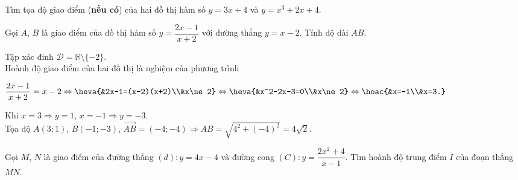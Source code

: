 \begin{bt}%

	Tìm tọa độ giao điểm (\textbf{nếu có}) của hai đồ thị hàm số $y=3x+4$ và $y=x^3+2x+4$.
\end{bt}

\begin{bt}%

	Gọi $A$, $B$ là giao điểm của đồ thị hàm số $y=\dfrac{2x-1}{x+2}$ với đường thẳng $y=x-2$. Tính độ dài $AB$.
	\loigiai
	{Tập xác đinh $\mathscr{D}=\mathbb{R}\setminus \{-2\}$.\\
		Hoành độ giao điểm của hai đồ thị là nghiệm của phương trình
		\begin{center}
			$\dfrac{2x-1}{x+2}=x-2\Leftrightarrow \heva{&2x-1=(x-2)(x+2)\\&x\ne 2}\Leftrightarrow \heva{&x^2-2x-3=0\\&x\ne 2}\Leftrightarrow \hoac{&x=-1\\&x=3.}$
		\end{center}
		Khi $x=3\Rightarrow y=1$, $x=-1\Rightarrow y=-3$.\\
		Tọa độ $A(3;1)$, $B(-1;-3)$, $\overrightarrow{AB}=(-4;-4)\Rightarrow AB=\sqrt{4^2+(-4)^2}=4\sqrt{2}$.
	}
\end{bt}

\begin{bt}%

	Gọi $M$, $N$ là giao điểm của đường thẳng $(d)\colon y=4x-4$ và đường cong $(C)\colon y=\dfrac{2x^2+4}{x-1}$. Tìm hoành độ trung điểm $I$ của đoạn thẳng $MN$.
\end{bt}

